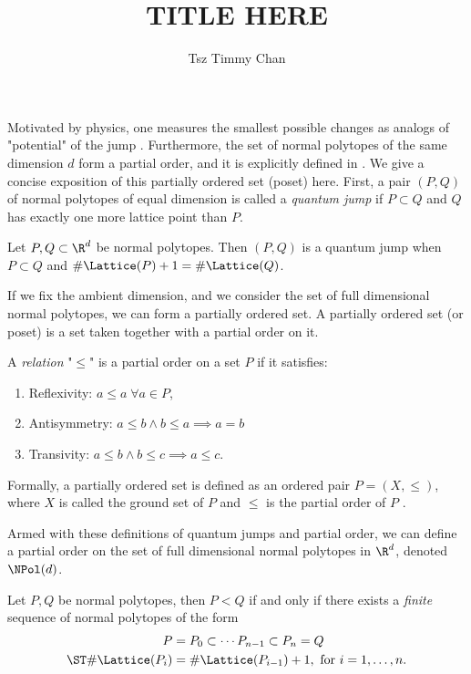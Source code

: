 \documentclass{TC}
\title{TITLE HERE}	%
\author{Tsz Timmy Chan}	%
\begin{document}
Motivated by physics, one measures the smallest possible changes as analogs of "potential" of the jump \cite{GubeladzeNormalPolytopeSurvey}. Furthermore, the set of normal polytopes of the same dimension $d$ form a partial order, and it is  explicitly defined in \cite{BrunsGubeladzeNormalPolytopes}. We give a concise exposition of this partially ordered set (poset) here. First, a pair $(P,Q)$ of normal polytopes of equal dimension is called a \emph{quantum jump} if $P \subset Q$ and $Q$ has exactly one more lattice point than $P$.


\begin{definition}
Let $P, Q \subset \R^d$ be normal polytopes. Then $(P,Q)$ is a quantum jump when $P \subset Q$ and $\#\Lattice(P) + 1 = \#\Lattice(Q)$. 
\end{definition}

If we fix the ambient dimension, and we consider the set of full dimensional normal polytopes, we can form a partially ordered set. A partially ordered set (or poset) is a set taken together with a partial order on it.


\begin{definition}
A \emph{relation} "$\leq$" is a partial order \cite{PartialOrder} on a set $P$ if it satisfies:
\begin{enumerate}
\item Reflexivity: $a \leq a\;\forall a \in P$,
\item Antisymmetry: $a \leq b \land b \leq a \implies a = b$ 
\item Transivity: $a \leq b \land b \leq c \implies a \leq c$.
\end{enumerate}

Formally, a partially ordered set is defined as an ordered pair $P=(X,\leq)$, where  $X$ is called the ground set of $P$ and $\leq$ is the partial order of $P$ \cite{PosetWolfram}.
\end{definition}




Armed with these definitions of quantum jumps and partial order, we can define a partial order on the set of full dimensional normal polytopes in $\R^d$, denoted $\NPol(d)$.


\begin{definition}
Let $P, Q$ be normal polytopes, then $P < Q$ if and only if there exists a \emph{finite} sequence of normal polytopes of the form 
\begin{align} P &= P_0 \subset \cdots P_{n-1} \subset P_n = Q \\
\ST \# \Lattice(P_i) &= \# \Lattice(P_{i-1}) +1, \text{ for } i = 1,\ldots,n.
\end{align}
\end{definition}
\end{document}
